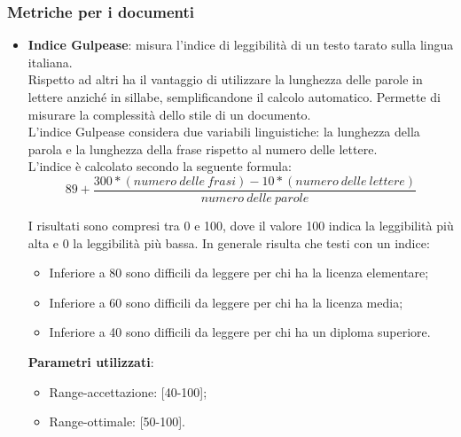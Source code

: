 {\subsubsection{Metriche per i documenti}{
	\label{sec:metricadocumenti}
	\begin{itemize}
		\item \textbf{Indice Gulpease}: misura l'indice di leggibilità di un testo tarato sulla lingua italiana.\\
		Rispetto ad altri ha il vantaggio di utilizzare la lunghezza delle parole in lettere anziché in sillabe, semplificandone il calcolo automatico. Permette di misurare la complessità dello stile di un documento.\\
		L'indice Gulpease considera due variabili linguistiche: la lunghezza della parola e la lunghezza della frase rispetto al numero delle lettere.\\
		L'indice è calcolato secondo la seguente formula:\\
		
		\[89 + \frac{300 *(numero\ delle\ frasi) -10 *(numero\ delle\ lettere)}{numero\ delle\ parole}\]
		
		I risultati sono compresi tra 0 e 100, dove il valore 100 indica la leggibilità più alta e 0 la leggibilità più bassa. In generale risulta che testi con un indice:
		
		\begin{itemize}
			\item Inferiore a 80 sono difficili da leggere per chi ha la licenza elementare;
			\item Inferiore a 60 sono difficili da leggere per chi ha la licenza media;
			\item Inferiore a 40 sono difficili da leggere per chi ha un diploma superiore.
		\end{itemize}
		
		\textbf{Parametri utilizzati}:
		\begin{itemize}
			\item Range-accettazione: [40-100];
			\item Range-ottimale: [50-100].
		\end{itemize}
	\end{itemize}
	}
}